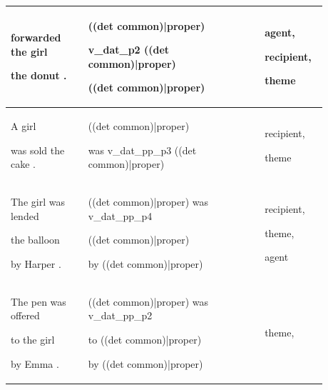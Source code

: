 \documentclass[11pt]{article}
\begin{document}
\begin{table}
\begin{tabular}{p{0.225\linewidth} p{0.50\linewidth} p{0.15\linewidth}}
\begin{tiny}
forwarded the girl 

the donut .\end{tiny} & \begin{tiny}((det common)|proper)

v\_dat\_p2 ((det common)|proper) 

((det common)|proper)\end{tiny} & \begin{tiny}agent,

recipient,

theme\end{tiny} \\
\hline
\begin{tiny}A girl 

was sold the cake .\end{tiny} & \begin{tiny}((det common)|proper)

was v\_dat\_pp\_p3 ((det common)|proper)\end{tiny} & \begin{tiny}recipient,

theme\end{tiny} \\
\hline
\begin{tiny}The girl was lended 

the balloon 

by Harper .\end{tiny} & \begin{tiny}((det common)|proper) was v\_dat\_pp\_p4 

((det common)|proper)

by ((det common)|proper)\end{tiny} & \begin{tiny}recipient,

theme,

agent\end{tiny} \\
\hline
\begin{tiny}The pen was offered

to the girl 

by Emma .\end{tiny} & \begin{tiny}((det common)|proper) was v\_dat\_pp\_p2 

to ((det common)|proper) 

by ((det common)|proper)\end{tiny} & \begin{tiny}theme,


\end{tiny}
\end{tabular}
\end{table}
\end{document}
